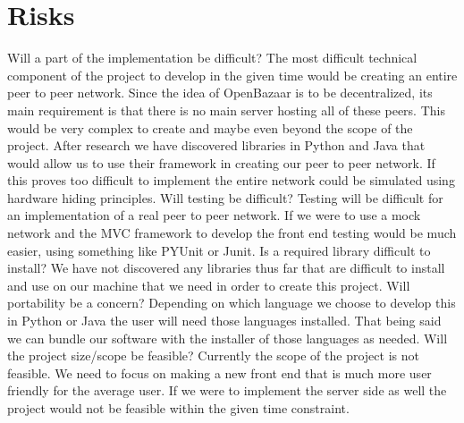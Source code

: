 \documentclass{article}
\begin{document}
\section{Risks}
Will a part of the implementation be difficult?\newline
The most difficult technical component of the project to develop in the given time would be creating an entire peer to peer network.
Since the idea of OpenBazaar is to be decentralized, its main requirement is that there is no main server hosting all of these peers. This would be very complex to create and maybe even beyond the scope of the project. After research we have discovered libraries in Python and Java that would allow us to use their framework in creating our peer to peer network. If this proves too difficult to implement the entire network could be simulated using hardware hiding principles.\newline
Will testing be difficult?\newline
Testing will be difficult for an implementation of a real peer to peer network. If we were to use a mock network and the MVC framework to develop the front end testing would be much easier, using something like PYUnit or Junit.\newline
Is a required library difficult to install?\newline
We have not discovered any libraries thus far that are difficult to install and use on our machine that we need in order to create this project.\newline
Will portability be a concern?\newline
Depending on which language we choose to develop this in Python or Java the user will need those languages installed. That being said we can bundle our software with the installer of those languages as needed.\newline
Will the project size/scope be feasible?\newline
Currently the scope of the project is not feasible. We need to focus on making a new front end that is much more user friendly for the average user. If we were to implement the server side as well the project would not be feasible within the given time constraint.\newline
\end{document}
